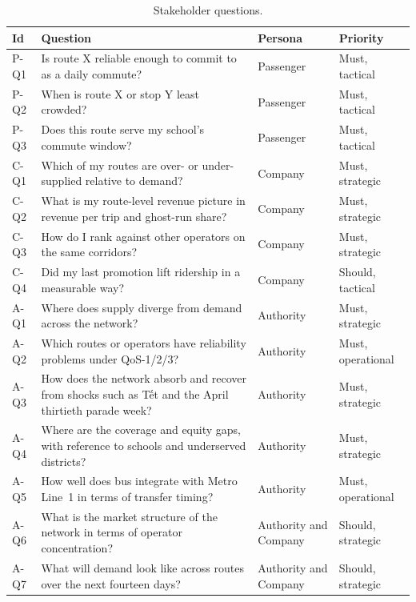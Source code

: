 \begin{table}[!htbp]
  \centering
  \caption{Stakeholder questions.}
  \label{tab:problem:questions}
  \footnotesize
  \renewcommand{\arraystretch}{1.15}
  \begin{tabularx}{\linewidth}{p{0.9cm}Xp{2.1cm}p{1.5cm}}
    \hline
    \textbf{Id} & \textbf{Question} & \textbf{Persona} & \textbf{Priority} \\
    \hline
    P-Q1 & Is route X reliable enough to commit to as a daily commute? & Passenger & Must, tactical \\
    P-Q2 & When is route X or stop Y least crowded? & Passenger & Must, tactical \\
    P-Q3 & Does this route serve my school's commute window? & Passenger & Must, tactical \\
    C-Q1 & Which of my routes are over- or under-supplied relative to demand? & Company & Must, strategic \\
    C-Q2 & What is my route-level revenue picture in revenue per trip and ghost-run share? & Company & Must, strategic \\
    C-Q3 & How do I rank against other operators on the same corridors? & Company & Must, strategic \\
    C-Q4 & Did my last promotion lift ridership in a measurable way? & Company & Should, tactical \\
    A-Q1 & Where does supply diverge from demand across the network? & Authority & Must, strategic \\
    A-Q2 & Which routes or operators have reliability problems under QoS-1/2/3? & Authority & Must, operational \\
    A-Q3 & How does the network absorb and recover from shocks such as Tết and the April thirtieth parade week? & Authority & Must, strategic \\
    A-Q4 & Where are the coverage and equity gaps, with reference to schools and underserved districts? & Authority & Must, strategic \\
    A-Q5 & How well does bus integrate with Metro Line~1 in terms of transfer timing? & Authority & Must, operational \\
    A-Q6 & What is the market structure of the network in terms of operator concentration? & Authority and Company & Should, strategic \\
    A-Q7 & What will demand look like across routes over the next fourteen days? & Authority and Company & Should, strategic \\
    \hline
  \end{tabularx}
\end{table}

